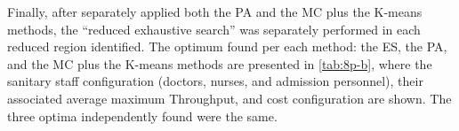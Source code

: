 \documentclass[11pt]{article} %
\begin{document}

Finally, after separately applied both the PA and the MC plus the
K-means methods, the \textquotedblleft{}reduced exhaustive search\textquotedblright{}
was separately performed in each reduced region identified. The optimum
found per each method: the ES, the PA, and the MC plus the K-means
methods are presented in \ref{tab:8p-b}, where the sanitary staff
configuration (doctors, nurses, and admission personnel), their associated
average maximum Throughput, and cost configuration are shown. The
three optima independently found were the same.
\end{document}
